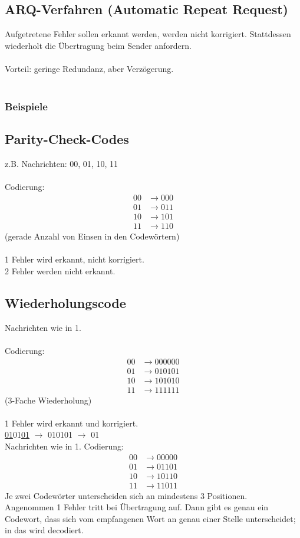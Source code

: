 \subsection{ARQ-Verfahren (Automatic Repeat Request)}
Aufgetretene Fehler sollen erkannt werden, werden nicht korrigiert. Stattdessen  wiederholt die \"Ubertragung beim Sender anfordern.\\
\\
Vorteil: geringe Redundanz, aber Verz\"ogerung.\\
\\
\subsubsection{Beispiele}
\subsection{Parity-Check-Codes}
z.B. Nachrichten: 00, 01, 10, 11\\
\\
Codierung:
\begin{align*}
	00 &\rightarrow 000\\
	01 &\rightarrow 011\\
	10 &\rightarrow 101\\
	11 &\rightarrow 110
\end{align*}
(gerade Anzahl von Einsen in den Codew\"ortern)\\
\\
1 Fehler wird erkannt, nicht korrigiert.\\
2 Fehler werden nicht erkannt.

\subsection{Wiederholungscode}
Nachrichten wie in 1.\\
\\
Codierung:
\begin{align*}
	00 &\rightarrow 000000\\
	01 &\rightarrow 010101\\
	10 &\rightarrow 101010\\
	11 &\rightarrow 111111
\end{align*}	
(3-Fache Wiederholung)\\
\\
1 Fehler wird erkannt und korrigiert.\\
\underline{01}01\underline{01} $\rightarrow$ 010101 $\rightarrow$ 01 \\
Nachrichten wie in 1.
Codierung:
\begin{align*}
	00 &\rightarrow 00000\\
	01 &\rightarrow 01101\\
	10 &\rightarrow 10110\\
	11 &\rightarrow 11011
\end{align*}
Je zwei Codew\"orter unterscheiden sich an mindestens 3 Positionen.\\
Angenommen 1 Fehler tritt bei \"Ubertragung auf. Dann gibt es genau ein Codewort, dass sich vom empfangenen Wort an genau einer Stelle unterscheidet; in das wird decodiert.

